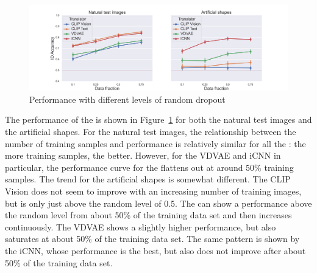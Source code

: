 \begin{figure}[ht]
  \centering
  \includegraphics[width=1\textwidth]{plots/dropout_random_translator.png}
  \caption[Translator Performance with increasing dropout]{ Performance with different levels of random dropout }\label{fig:dropout_random_translator}
\end{figure}

The performance of the  is shown in Figure~\ref{fig:dropout_random_translator} for both the natural test images and the artificial shapes. For the natural test images, the relationship between the number of training samples and performance is relatively similar for all the : the more training samples, the better. However, for the VDVAE and iCNN in particular, the performance curve for the  flattens out at around 50\% training samples. The trend for the artificial shapes is somewhat different. The CLIP Vision  does not seem to improve with an increasing number of training images, but is only just above the random level of 0.5. The   can show a performance above the random level from about 50\% of the training data set and then increases continuously. The VDVAE  shows a slightly higher performance, but also saturates at about 50\% of the training data set. The same pattern is shown by the iCNN, whose performance is the best, but also does not improve after about 50\% of the training data set. 


